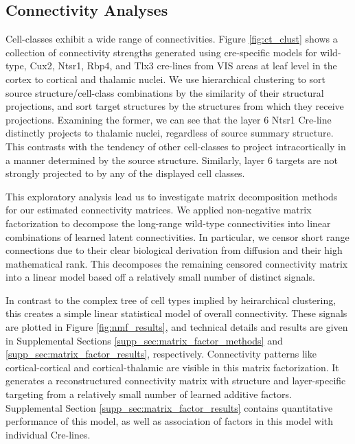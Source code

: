 \newpage

\subsection{Connectivity Analyses}

Cell-classes exhibit a wide range of connectivities.
Figure \ref{fig:ct_clust} shows a collection of connectivity strengths generated using cre-specific models for wild-type, Cux2, Ntsr1, Rbp4, and Tlx3 cre-lines from VIS areas at leaf level in the cortex to cortical and thalamic nuclei.
We use hierarchical clustering to sort source structure/cell-class combinations by the similarity of their structural projections, and sort target structures by the structures from which they receive projections.
Examining the former, we can see that the layer 6 Ntsr1 Cre-line distinctly projects to thalamic nuclei, regardless of source summary structure.
This contrasts with the tendency of other cell-classes to project intracortically in a manner determined by the source structure.
Similarly, layer 6 targets are not strongly projected to by any of the displayed cell classes.

This exploratory analysis lead us to investigate matrix decomposition methods for our estimated connectivity matrices.
We applied non-negative matrix factorization to decompose the long-range wild-type connectivities into linear combinations of learned latent connectivities.
In particular, we censor short range connections due to their clear biological derivation from diffusion and their high mathematical rank.
This decomposes the remaining censored connectivity matrix into a linear model based off a relatively small number of distinct signals.

In contrast to the complex tree of cell types implied by heirarchical clustering, this creates a simple linear statistical model of overall connectivity. 
These signals are plotted in Figure \ref{fig:nmf_results}, and technical details and results are given in Supplemental Sections \ref{supp_sec:matrix_factor_methods} and \ref{supp_sec:matrix_factor_results}, respectively.
Connectivity patterns like cortical-cortical and cortical-thalamic are visible in this matrix factorization.
It generates a reconstructured connectivity matrix with structure and layer-specific targeting from a relatively small number of learned additive factors.
Supplemental Section \ref{supp_sec:matrix_factor_results} contains quantitative performance of this model, as well as association of factors in this model with individual Cre-lines.

